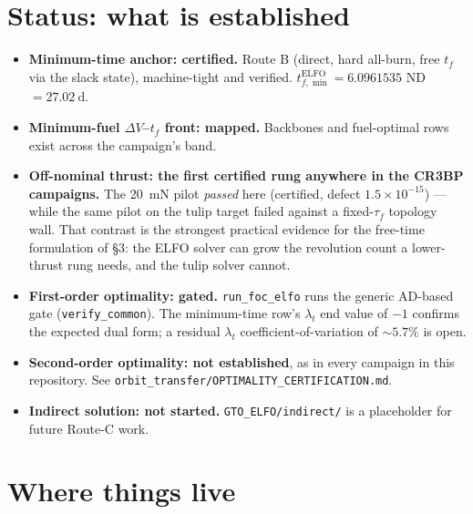 \documentclass[11pt]{article}
\newcommand{\file}[1]{\texttt{#1}}
\begin{document}
\section{Status: what is established
\label{sec:status}}

\begin{itemize}
\item \textbf{Minimum-time anchor: certified.} Route B (direct, hard all-burn,
free $t_f$ via the slack state), machine-tight and verified.
$t_{f,\min}^{\text{ELFO}}=6.0961535$ ND $=\SI{27.02}{\day}$.

\item \textbf{Minimum-fuel $\Delta V$--$t_f$ front: mapped.} Backbones and
fuel-optimal rows exist across the campaign's band.

\item \textbf{Off-nominal thrust: the first certified rung anywhere in the
CR3BP campaigns.} The \SI{20}{\milli\newton} pilot \emph{passed} here
(certified, defect $1.5\times10^{-15}$) --- while the same pilot on the tulip
target failed against a fixed-$\tau_f$ topology wall. That contrast is the
strongest practical evidence for the free-time formulation of \S3: the ELFO
solver can grow the revolution count a lower-thrust rung needs, and the tulip
solver cannot.

\item \textbf{First-order optimality: gated.} \file{run\_foc\_elfo} runs the
generic AD-based gate (\file{verify\_common}). The minimum-time row's
$\lambda_t$ end value of $-1$ confirms the expected dual form; a residual
$\lambda_t$ coefficient-of-variation of $\sim5.7\%$ is open.

\item \textbf{Second-order optimality: not established}, as in every campaign
in this repository. See \file{orbit\_transfer/OPTIMALITY\_CERTIFICATION.md}.

\item \textbf{Indirect solution: not started.} \file{GTO\_ELFO/indirect/} is a
placeholder for future Route-C work.
\end{itemize}

\section{Where things live}
\end{document}
